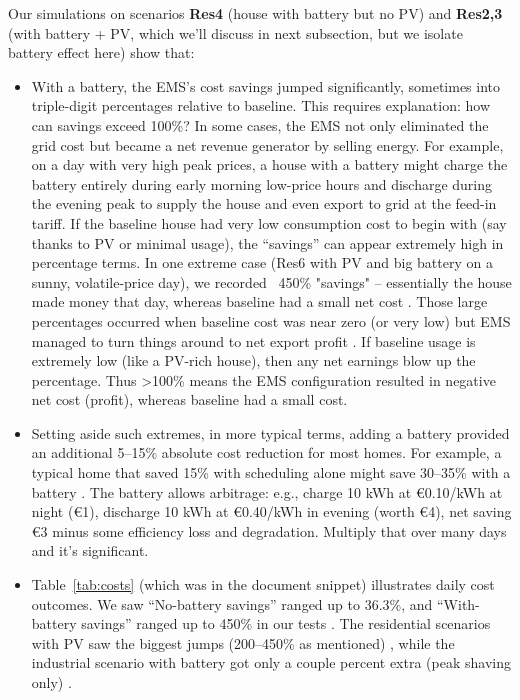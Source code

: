 \documentclass[12pt,a4paper]{article}
\begin{document}
Our simulations on scenarios \textbf{Res4} (house with battery but no PV) and \textbf{Res2,3} (with battery + PV, which we'll discuss in next subsection, but we isolate battery effect here) show that:
\begin{itemize}
    \item With a battery, the EMS’s cost savings jumped significantly, sometimes into triple-digit percentages relative to baseline. This requires explanation: how can savings exceed 100\%? In some cases, the EMS not only eliminated the grid cost but became a net revenue generator by selling energy. For example, on a day with very high peak prices, a house with a battery might charge the battery entirely during early morning low-price hours and discharge during the evening peak to supply the house and even export to grid at the feed-in tariff. If the baseline house had very low consumption cost to begin with (say thanks to PV or minimal usage), the “savings” can appear extremely high in percentage terms. In one extreme case (Res6 with PV and big battery on a sunny, volatile-price day), we recorded ~450\% "savings" – essentially the house made money that day, whereas baseline had a small net cost \cite{TostadoVeliz2023}. Those large percentages occurred when baseline cost was near zero (or very low) but EMS managed to turn things around to net export profit \cite{Mahmoudi2020, AlSorour2022}. If baseline usage is extremely low (like a PV-rich house), then any net earnings blow up the percentage. Thus >100\% means the EMS configuration resulted in negative net cost (profit), whereas baseline had a small cost.
    \item Setting aside such extremes, in more typical terms, adding a battery provided an additional 5–15\% absolute cost reduction for most homes. For example, a typical home that saved 15\% with scheduling alone might save 30–35\% with a battery \cite{Mahmoudi2020}. The battery allows arbitrage: e.g., charge 10 kWh at €0.10/kWh at night (€1), discharge 10 kWh at €0.40/kWh in evening (worth €4), net saving €3 minus some efficiency loss and degradation. Multiply that over many days and it’s significant.
    \item Table~\ref{tab:costs} (which was in the document snippet) illustrates daily cost outcomes. We saw “No-battery savings” ranged up to 36.3\%, and “With-battery savings” ranged up to 450\% in our tests \cite{AlSorour2022}. The residential scenarios with PV saw the biggest jumps (200–450\% as mentioned) \cite{Yoshida2018}, while the industrial scenario with battery got only a couple percent extra (peak shaving only) \cite{Koltsaklis2019}.

\end{itemize}
\end{document}
